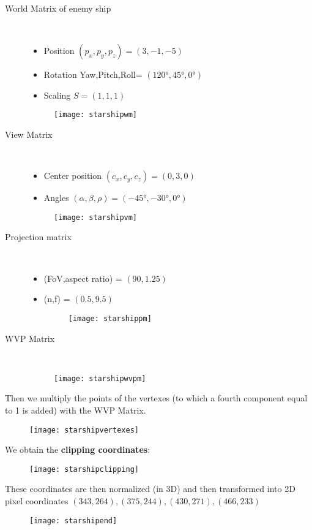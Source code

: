 \begin{description}
\item[World Matrix of enemy ship]\hfill\\
\begin{itemize}
\item Position $(p_x,p_y,p_z) = (3,-1,-5)$
\item Rotation Yaw,Pitch,Roll= $(\ang{120},\ang{45},\ang{0})$
\item Scaling $S=(1,1,1)$
\end{itemize}
\begin{figure}[H]
  \centering
  \texttt{[image: starshipwm]}
\end{figure}
\item[View Matrix]\hfill\\
\begin{itemize}
\item Center position $(c_x,c_y,c_z) = (0,3,0)$
\item Angles $(\alpha,\beta,\rho) = (\ang{-45}, \ang{-30}, \ang{0})$
\end{itemize}
\begin{figure}[H]
  \centering
  \texttt{[image: starshipvm]}
\end{figure}
\item[Projection matrix]\hfill\\
\begin{itemize}
\item (FoV,aspect ratio) = $(90,1.25)$
\item (n,f) = $(0.5,9.5)$
\begin{figure}[H]
  \centering
  \texttt{[image: starshippm]}
\end{figure}
\end{itemize}
\item[WVP Matrix]\hfill\\
\begin{figure}[H]
  \centering
  \texttt{[image: starshipwvpm]}
\end{figure}
\end{description}
Then we multiply the points of the vertexes (to which a fourth component equal to 1 is added) with the WVP Matrix.
\begin{figure}[H]
  \centering
  \texttt{[image: starshipvertexes]}
\end{figure}
We obtain the \textbf{clipping coordinates}:
\begin{figure}[H]
  \centering
  \texttt{[image: starshipclipping]}
\end{figure}
These coordinates are then normalized (in 3D) and then transformed into 2D pixel coordinates $(343,264) , (375,244),  (430,271) , (466,233)$

\begin{figure}[H]
  \centering
  \texttt{[image: starshipend]}
\end{figure}
